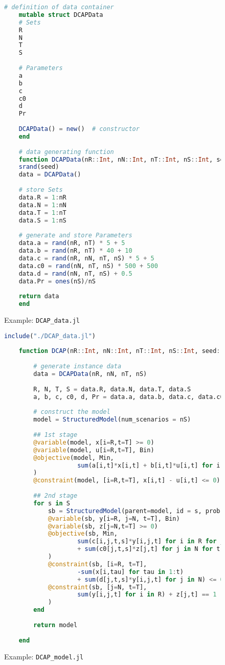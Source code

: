 \begin{figure}[]
	\centering
	\begin{lstlisting}[frame=single,language=julia]
	# definition of data container
	mutable struct DCAPData	
	# Sets
	R   
	N  
	T   
	S  
	
	# Parameters
	a   
	b   
	c  
	c0  
	d   
	Pr  
	
	DCAPData() = new()	# constructor
	end
	
	# data generating function
	function DCAPData(nR::Int, nN::Int, nT::Int, nS::Int, seed::Int)::DCAPData
	srand(seed)
	data = DCAPData()
	
	# store Sets
	data.R = 1:nR	
	data.N = 1:nN	
	data.T = 1:nT	
	data.S = 1:nS	
	
	# generate and store Parameters
	data.a = rand(nR, nT) * 5 + 5
	data.b = rand(nR, nT) * 40 + 10	
	data.c = rand(nR, nN, nT, nS) * 5 + 5	
	data.c0 = rand(nN, nT, nS) * 500 + 500	
	data.d = rand(nN, nT, nS) + 0.5	
	data.Pr = ones(nS)/nS
	
	return data
	end
	\end{lstlisting}
	\caption{Example: \texttt{DCAP\_data.jl}}
	\label{fig:DCAP_data.jl}
\end{figure}
\begin{figure}[]
	\centering
	\begin{lstlisting}[frame=single,language=julia]
	include("./DCAP_data.jl")
	
	function DCAP(nR::Int, nN::Int, nT::Int, nS::Int, seed::Int)::JuMP.Model
	
		# generate instance data
		data = DCAPData(nR, nN, nT, nS)
		
		R, N, T, S = data.R, data.N, data.T, data.S
		a, b, c, c0, d, Pr = data.a, data.b, data.c, data.c0, data.d, data.Pr
		
		# construct the model
		model = StructuredModel(num_scenarios = nS)
		
		## 1st stage
		@variable(model, x[i=R,t=T] >= 0)
		@variable(model, u[i=R,t=T], Bin)
		@objective(model, Min, 
					sum(a[i,t]*x[i,t] + b[i,t]*u[i,t] for i in R for t in T)
		)
		@constraint(model, [i=R,t=T], x[i,t] - u[i,t] <= 0)
		
		## 2nd stage
		for s in S
			sb = StructuredModel(parent=model, id = s, prob = Pr[s])
			@variable(sb, y[i=R, j=N, t=T], Bin)
			@variable(sb, z[j=N,t=T] >= 0)
			@objective(sb, Min, 
					sum(c[i,j,t,s]*y[i,j,t] for i in R for j in N for t in T) 
					+ sum(c0[j,t,s]*z[j,t] for j in N for t in T)
			)
			@constraint(sb, [i=R, t=T], 
					-sum(x[i,tau] for tau in 1:t) 
					+ sum(d[j,t,s]*y[i,j,t] for j in N) <= 0)
			@constraint(sb, [j=N, t=T], 
					sum(y[i,j,t] for i in R) + z[j,t] == 1
			)
		end
	
		return model
		
	end
	\end{lstlisting}
	\caption{Example: \texttt{DCAP\_model.jl}}\label{fig:DCAP_model.jl}
\end{figure}
